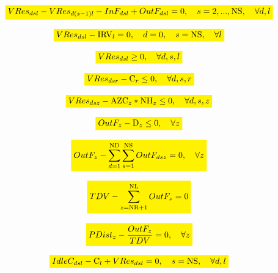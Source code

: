 \documentclass{singlecol}
\newcommand{\mathcolorbox}[2]{\colorbox{#1}{$\displaystyle #2$}}
\theoremstyle{TH}{
\newtheorem{lemma}{Lemma}
\newtheorem{theorem}[lemma]{Theorem}
\newtheorem{corrolary}[lemma]{Corrolary}
\newtheorem{conjecture}[lemma]{Conjecture}
\newtheorem{proposition}[lemma]{Proposition}
\newtheorem{claim}[lemma]{Claim}
\newtheorem{stheorem}[lemma]{Wrong Theorem}
\newtheorem{algorithm}{Algorithm}
}
\theoremstyle{THrm}{
\newtheorem{definition}{Definition}[section]
\newtheorem{question}{Question}[section]
\newtheorem{remark}{Remark}
\newtheorem{scheme}{Scheme}
}
\theoremstyle{THhit}{
\newtheorem{case}{Case}[section]
}
\begin{document}
\begin{equation}
	\mathcolorbox{yellow}{VRes_{dsl} - VRes_{d(s-1)l} - InF_{dsl} + OutF_{dsl} = 0, \quad s=2,...,\mathrm{NS}, \quad \forall{d,l}}
	\label{eq:volRem!T1}
\end{equation}

\begin{equation}
	\mathcolorbox{yellow}{VRes_{dsl} - \mathrm{IRV}_l = 0, \quad d = 0, \quad s = \mathrm{NS}, \quad \forall{l}}
	\label{eq:volRStart}
\end{equation}

\begin{equation}
	\mathcolorbox{yellow}{VRes_{dsl} \geq 0, \quad \forall{d,s,l}}
	\label{eq:minRV}
\end{equation}

\begin{equation}
	\mathcolorbox{yellow}{VRes_{dsr} - \mathrm{C}_{r} \leq 0, \quad \forall{d,s,r}}
	\label{eq:maxRV}
\end{equation}

\begin{equation}
	\mathcolorbox{yellow}{VRes_{dsz} - \mathrm{AZC}_z*\mathrm{NH}_z \leq 0, \quad \forall{d,s,z}}
	\label{eq:maxRZV}
\end{equation}

\begin{equation}
	\mathcolorbox{yellow}{OutF_{z} -  \mathrm{D}_z  \leq 0,  \quad \forall z}
	\label{eq:demandRes}
\end{equation}

\begin{equation}
	\mathcolorbox{yellow}{OutF_{z} - \sum_{d=1}^{\mathrm{ND}}\sum_{s=1}^{\mathrm{NS}}{OutF_{dsz}} = 0, \quad \forall z}
	\label{eq:evalTOutFZone}
\end{equation}

\begin{equation}
	\mathcolorbox{yellow}{TDV - \sum_{z=\mathrm{NR}+1}^{\mathrm{NL}}{OutF_{z}} = 0}
	\label{eq:evalTOutF}
\end{equation}

\begin{equation}
	\mathcolorbox{yellow}{PDist_{z} - \dfrac{OutF_{z}}{TDV} = 0, \quad \forall z}
	\label{eq:evalPDist}
\end{equation}

\begin{equation}
	\mathcolorbox{yellow}{IdleC_{dsl} - \mathrm{C}_{l} + VRes_{dsl} = 0, \quad s = \mathrm{NS}, \quad \forall{d, l}}
	\label{eq:evalIdleCap}
\end{equation}
\end{document}
